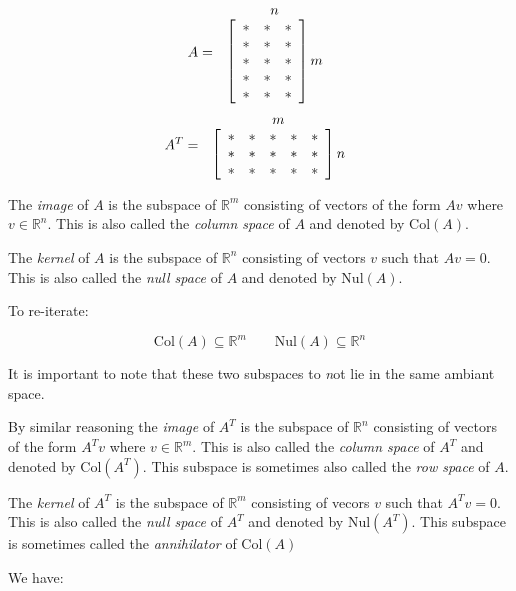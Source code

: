 \documentclass[11pt]{article}
\begin{document}
\[ A =
\begin{array}{c@{\,}c@{\,}c}
  & n & \\
 &
\left[
\begin{array}{ccc}
 * & *  & *  \\
 * & *  & *  \\
  * & *  & *  \\
   * & *  & *  \\
    * & *  & *  
\end{array}
\right] m
\end{array}
\]
\[
 A^T =
\begin{array}{c@{\,}c@{\,}c}
  & m & \\
 &
\left[
\begin{array}{ccccc}
 *   &  * & * & * & * \\
*   &  * & * & * & * \\
*   &  * & * & * & * 
\end{array}
\right] n
\end{array}
\]

The \emph{image} of $A$ is the subspace of $\mathbb{R}^m$ consisting of vectors of the form $Av$ where $v \in \mathbb{R}^n$. This is also called the \emph{column space} of $A$ and denoted by $\mathrm{Col}(A)$.

The \emph{kernel} of $A$ is the subspace of $\mathbb{R}^n$ consisting of vectors $v$ such that $Av = 0$. This is also called the \emph{null space} of $A$ and denoted by $\mathrm{Nul}(A)$.

To re-iterate:

\[ \mathrm{Col}(A) \subseteq \mathbb{R}^m   \qquad
\mathrm{Nul}(A) \subseteq \mathbb{R}^n
\]

It is important to note that these two subspaces to {\emph not} lie in the same ambiant space. 

By similar reasoning the \emph{image} of $A^T$ is the subspace of $\mathbb{R}^n$ consisting of vectors of the form $A^Tv$ where $v \in \mathbb{R}^m$. This is also called the \emph{column space} of $A^T$ and denoted by $\mathrm{Col}(A^T)$. This subspace is sometimes also called the \emph{row space} of $A$.

The \emph{kernel} of $A^T$ is the subspace of $\mathbb{R}^m$ consisting of vecors $v$ such that $A^Tv = 0$. This is also called the \emph{null space} of $A^T$ and denoted by $\mathrm{Nul}(A^T)$. This subspace is sometimes called the \emph{annihilator} of $\mathrm{Col}(A)$




We have:
\end{document}
